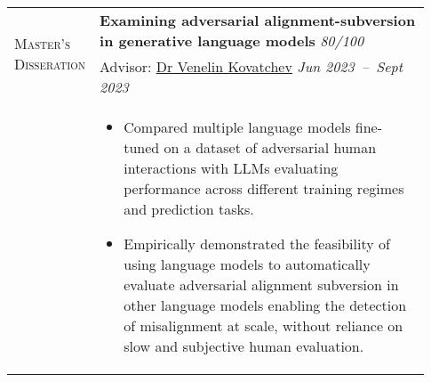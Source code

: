 \documentclass[letterpaper, 10pt, oneside]{article}
\newcommand{\stitle}[1]{\normalsize{\textsc{#1}}}
\newcommand{\bdit}[1]{{\textbf{#1}}}
\begin{document}
\begin{longtable}{@{} p{0.13\linewidth} p{0.8\linewidth}}
      \multirow{2}{6.5em}{\stitle{Master's Disseration}}   & \bdit{Examining adversarial alignment-subversion in generative language models}                                                                                                             \hfill \textsl{80/100}  \\
                                                      & Advisor: \href{https://vkovatchev.com/}{Dr Venelin Kovatchev} \hfill \textsl{Jun 2023\ --\ Sept 2023}                                                                                   \\
                                                      & \parbox{0.8\textwidth}{                                                                                                                                                                               %
        \begin{itemize}[leftmargin=*, itemsep=-0.70ex, topsep=-0.88ex]
            \item Compared multiple language models fine-tuned on a dataset of adversarial human interactions with LLMs evaluating performance across different training regimes and prediction tasks.
            \item Empirically demonstrated the feasibility of using language models to automatically evaluate adversarial alignment subversion in other language models enabling the detection of misalignment at scale, without reliance on slow and subjective human evaluation.
        \end{itemize}
    }
    \\
    \\


\end{longtable}
\end{document}

